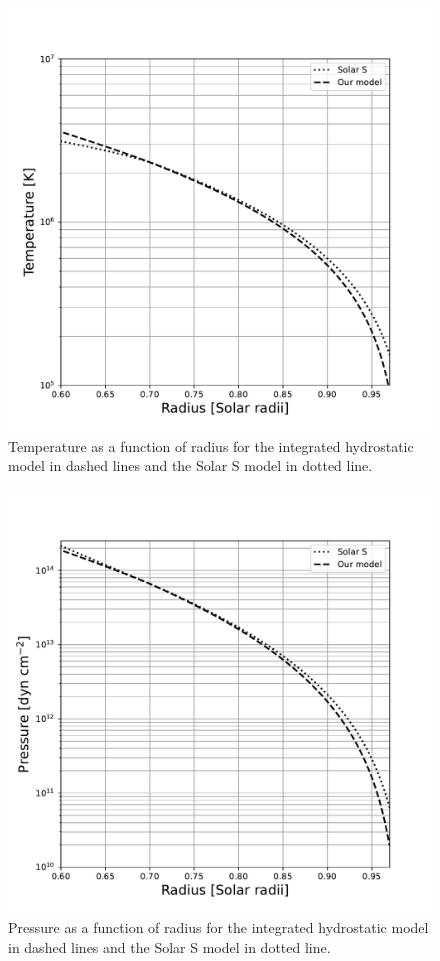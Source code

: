 \begin{figure}[htbp]
    \centering
    \includegraphics[width=0.8\linewidth]{./solar_vs_model_plots/Temperature.pdf} %
    \caption{Temperature as a function of radius for the integrated hydrostatic model in dashed lines and the Solar S model in dotted line.}
    \label{fig:temperature} %
\end{figure}

\begin{figure}[htbp]
    \centering
    \includegraphics[width=0.8\linewidth]{./solar_vs_model_plots/Pressure.pdf} %
    \caption{Pressure as a function of radius for the integrated hydrostatic model in dashed lines and the Solar S model in dotted line.}
    \label{fig:pressure} %
\end{figure}


